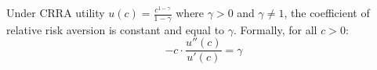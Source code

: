 %
%
%
%

\begin{claim}
Under CRRA utility $u(c) = \frac{c^{1-\gamma}}{1-\gamma}$ where $\gamma > 0$ and
$\gamma \neq 1$, the coefficient of relative risk aversion is constant and equal to
$\gamma$. Formally, for all $c > 0$:
\[
  -c \cdot \frac{u''(c)}{u'(c)} = \gamma
\]
\end{claim}
